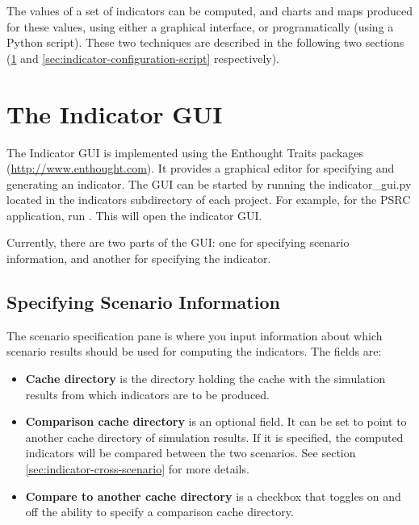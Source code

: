 The values of a set of indicators \indicatorsindex can be computed,
and charts and maps produced for these values, using either a
graphical interface, or programatically (using a Python script).
These two techniques are described in the following two sections
(\ref{sec:indicator-configuration-gui} and
\ref{sec:indicator-configuration-script} respectively).  

\section{The Indicator GUI}
\label{sec:indicator-configuration-gui}

The Indicator GUI is implemented using the Enthought Traits packages
(\url{http://www.enthought.com}).  It provides a graphical editor for
specifying and generating an indicator.  The GUI can be started by running
the indicator_gui.py located in the indicators subdirectory of each
project. For example, for the PSRC application, run
.  This will open the indicator GUI.

Currently, there are two parts of the GUI: one for specifying scenario 
information, and another for specifying the indicator. 

\subsection{Specifying Scenario Information}
The scenario specification pane is where you input information 
about which scenario results should be used for computing the indicators. 
The fields are:

\begin{itemize}

\tight

\item {\bf Cache directory} is the directory holding the cache with the
simulation results from which indicators are to be produced.

\item {\bf Comparison cache directory} is an optional field. It can be set to
point to another cache directory of simulation results.  If it is
specified, the computed indicators will be compared between the two
scenarios. See section \ref{sec:indicator-cross-scenario} for more details.

\item {\bf Compare to another cache directory} is a checkbox that toggles
on and off the ability to specify a comparison cache directory.

\end{itemize}

